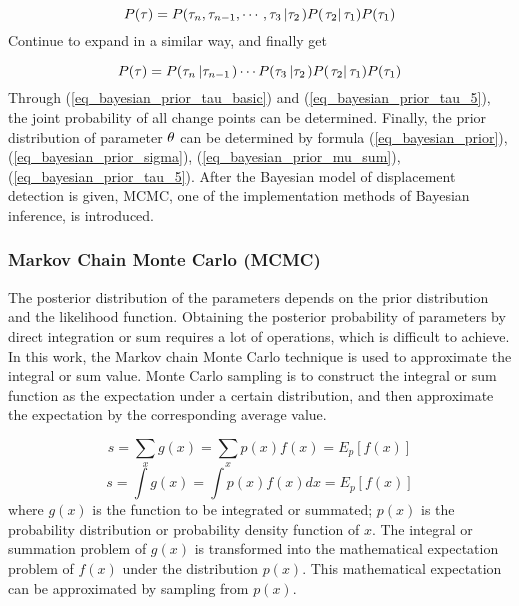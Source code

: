 \documentclass[journal]{IEEEtran}
\begin{document}
\begin{equation}\label{eq_bayesian_prior_tau_4}
P({\bf{\tau }}) = P({\tau _n},{\tau _{n - 1}}, \cdots ,{\tau _3}\left| {{\tau _2}} \right.)P(\left. {{\tau _2}} \right|{\tau _1})P({\tau _1})
\end{equation}
Continue to expand in a similar way, and finally get

\begin{equation}\label{eq_bayesian_prior_tau_5}
P({\bf{\tau }}) = P({\tau _n}\left| {{\tau _{n - 1}}} \right.) \cdots P({\tau _3}\left| {{\tau _2}} \right.)P(\left. {{\tau _2}} \right|{\tau _1})P({\tau _1})
\end{equation}
Through (\ref{eq_bayesian_prior_tau_basic}) and (\ref{eq_bayesian_prior_tau_5}), the joint probability of all change points can be determined. Finally, the prior distribution of parameter ${\bf{\theta }}$ can be determined by formula (\ref{eq_bayesian_prior}), (\ref{eq_bayesian_prior_sigma}), (\ref{eq_bayesian_prior_mu_sum}), (\ref{eq_bayesian_prior_tau_5}).  After the Bayesian model of displacement detection is given, MCMC, one of the implementation methods of Bayesian inference, is introduced.

\subsubsection{Markov Chain Monte Carlo (MCMC)}
The posterior distribution of the parameters depends on the prior distribution and the likelihood function. Obtaining the posterior probability of parameters by direct integration or sum requires a lot of operations, which is difficult to achieve\cite{robert2013monte}. In this work, the Markov chain Monte Carlo technique is used to approximate the integral or sum value. Monte Carlo sampling is to construct the integral or sum function as the expectation under a certain distribution, and then approximate the expectation by the corresponding average value\cite{goodfellow2016deep}.

\begin{equation}\label{eq_monte_carlo_1}
s =\sum\limits_x g(x)= \sum\limits_x {p(x)f(x) = {E_p}[f(x)]}
\end{equation}
\begin{equation}\label{eq_monte_carlo_2}
s =\int {g(x)}= \int {p(x)f(x)dx}  = {E_p}[f(x)]
\end{equation}
where $g(x)$ is the function to be integrated or summated; $p(x)$ is the probability distribution or probability density function of $x$. The integral or summation problem of $g(x)$ is transformed into the mathematical expectation problem of $f(x)$ under the distribution $p(x)$. This mathematical expectation can be approximated by sampling from $p(x)$\cite{goodfellow2016deep}.
\end{document}
